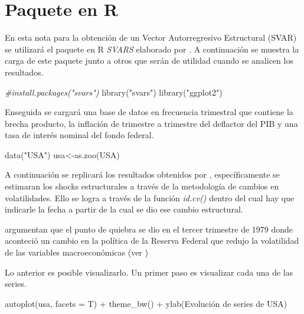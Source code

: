 \documentclass[
]{book}
\newenvironment{Shaded}{\begin{snugshade}}{\end{snugshade}}
\newcommand{\AttributeTok}[1]{\textcolor[rgb]{0.77,0.63,0.00}{#1}}
\newcommand{\CommentTok}[1]{\textcolor[rgb]{0.56,0.35,0.01}{\textit{#1}}}
\newcommand{\FunctionTok}[1]{\textcolor[rgb]{0.00,0.00,0.00}{#1}}
\newcommand{\NormalTok}[1]{#1}
\newcommand{\OtherTok}[1]{\textcolor[rgb]{0.56,0.35,0.01}{#1}}
\newcommand{\SpecialCharTok}[1]{\textcolor[rgb]{0.00,0.00,0.00}{#1}}
\newcommand{\StringTok}[1]{\textcolor[rgb]{0.31,0.60,0.02}{#1}}
\begin{document}
\hypertarget{paquete-en-r}{%
\section{Paquete en R}\label{paquete-en-r}}

En esta nota para la obtención de un Vector Autorregresivo Estructural (SVAR) se utilizará el paquete en R \emph{SVARS} elaborado por \citet{SVAR21}. A continuación se muestra la carga de este paquete junto a otros que serán de utilidad cuando se analicen los resultados.

\begin{Shaded}
\begin{Highlighting}[]
\CommentTok{\#install.packages("svars")}
\FunctionTok{library}\NormalTok{(}\StringTok{"svars"}\NormalTok{)}
\FunctionTok{library}\NormalTok{(}\StringTok{"ggplot2"}\NormalTok{)}
\end{Highlighting}
\end{Shaded}

Enseguida se cargará una base de datos en frecuencia trimestral que contiene la brecha producto, la inflación de trimestre a trimestre del deflactor del PIB y una tasa de interés nominal del fondo federal.

\begin{Shaded}
\begin{Highlighting}[]
\FunctionTok{data}\NormalTok{(}\StringTok{"USA"}\NormalTok{)}
\NormalTok{usa}\OtherTok{\textless{}{-}}\FunctionTok{as.zoo}\NormalTok{(USA)}
\end{Highlighting}
\end{Shaded}

A continuación se replicará los resultados obtenidos por \citet{Herwartz2016}, específicamente se estimaran los shocks estructurales a través de la metodología de cambios en volatilidades. Ello se logra a través de la función \emph{id.cv()} dentro del cual hay que indicarle la fecha a partir de la cual se dio ese cambio estructural.

\citet{Herwartz2016} argumentan que el punto de quiebra se dio en el tercer trimestre de 1979 donde aconteció un cambio en la política de la Reserva Federal que redujo la volatilidad de las variables macroeconómicas (ver \citet{Stock2003})

Lo anterior es posible visualizarlo.
Un primer paso es visualizar cada una de las series.

\begin{Shaded}
\begin{Highlighting}[]
\FunctionTok{autoplot}\NormalTok{(usa, }\AttributeTok{facets =}\NormalTok{ T) }\SpecialCharTok{+} \FunctionTok{theme\_bw}\NormalTok{() }\SpecialCharTok{+} \FunctionTok{ylab}\NormalTok{(}\StringTok{\textquotesingle{}Evolución de series de USA\textquotesingle{}}\NormalTok{)}
\end{Highlighting}
\end{Shaded}
\end{document}
